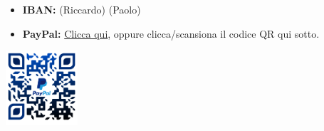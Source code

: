 \section*{}
\begin{itemize}[left=0pt, itemindent=-4em, labelsep=1em]
  \item \textbf{IBAN:}\newline
  \href{\Riccardolink}{\ibanRic} (Riccardo)\newline
  \href{\Paololink}{\ibanPao} (Paolo)
  \\
  \item \textbf{PayPal:}\newline
  \href{\PayPallink}{Clicca qui},
  oppure clicca/scansiona il codice QR qui sotto.
\end{itemize}
\vspace{2.5mm}
\begin{center}
  \href{\PayPallink}{
    \includegraphics[width=0.2\textwidth]{../QR_PayPal.png}
  }
\end{center}